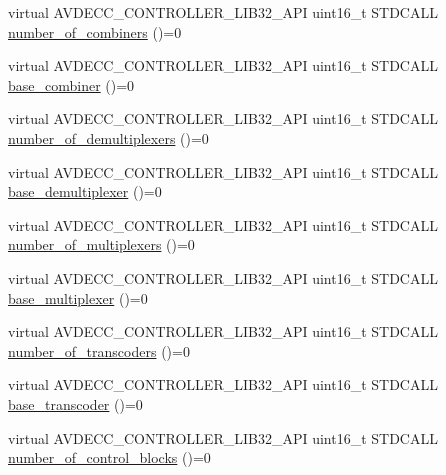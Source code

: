 \begin{DoxyCompactItemize}
\item 
virtual A\+V\+D\+E\+C\+C\+\_\+\+C\+O\+N\+T\+R\+O\+L\+L\+E\+R\+\_\+\+L\+I\+B32\+\_\+\+A\+PI uint16\+\_\+t S\+T\+D\+C\+A\+LL \hyperlink{classavdecc__lib_1_1audio__unit__descriptor__response_ac1a2c85e1ee224b6af5ce5e04183b3b8}{number\+\_\+of\+\_\+combiners} ()=0
\item 
virtual A\+V\+D\+E\+C\+C\+\_\+\+C\+O\+N\+T\+R\+O\+L\+L\+E\+R\+\_\+\+L\+I\+B32\+\_\+\+A\+PI uint16\+\_\+t S\+T\+D\+C\+A\+LL \hyperlink{classavdecc__lib_1_1audio__unit__descriptor__response_ad2ed6c298e99279c61cd9bad311a3db4}{base\+\_\+combiner} ()=0
\item 
virtual A\+V\+D\+E\+C\+C\+\_\+\+C\+O\+N\+T\+R\+O\+L\+L\+E\+R\+\_\+\+L\+I\+B32\+\_\+\+A\+PI uint16\+\_\+t S\+T\+D\+C\+A\+LL \hyperlink{classavdecc__lib_1_1audio__unit__descriptor__response_a1f51a5c28ed8984f4ff5bd36fe74230f}{number\+\_\+of\+\_\+demultiplexers} ()=0
\item 
virtual A\+V\+D\+E\+C\+C\+\_\+\+C\+O\+N\+T\+R\+O\+L\+L\+E\+R\+\_\+\+L\+I\+B32\+\_\+\+A\+PI uint16\+\_\+t S\+T\+D\+C\+A\+LL \hyperlink{classavdecc__lib_1_1audio__unit__descriptor__response_ac2b5c1d4b61b5e0819eda852932d1bc4}{base\+\_\+demultiplexer} ()=0
\item 
virtual A\+V\+D\+E\+C\+C\+\_\+\+C\+O\+N\+T\+R\+O\+L\+L\+E\+R\+\_\+\+L\+I\+B32\+\_\+\+A\+PI uint16\+\_\+t S\+T\+D\+C\+A\+LL \hyperlink{classavdecc__lib_1_1audio__unit__descriptor__response_ab9eb22dad38f80e0d6886ac65384ad7e}{number\+\_\+of\+\_\+multiplexers} ()=0
\item 
virtual A\+V\+D\+E\+C\+C\+\_\+\+C\+O\+N\+T\+R\+O\+L\+L\+E\+R\+\_\+\+L\+I\+B32\+\_\+\+A\+PI uint16\+\_\+t S\+T\+D\+C\+A\+LL \hyperlink{classavdecc__lib_1_1audio__unit__descriptor__response_a0e9b358ce1d3bcadf069b2ba98703be7}{base\+\_\+multiplexer} ()=0
\item 
virtual A\+V\+D\+E\+C\+C\+\_\+\+C\+O\+N\+T\+R\+O\+L\+L\+E\+R\+\_\+\+L\+I\+B32\+\_\+\+A\+PI uint16\+\_\+t S\+T\+D\+C\+A\+LL \hyperlink{classavdecc__lib_1_1audio__unit__descriptor__response_a55670f24cb0eef2234ebd0629e4fb503}{number\+\_\+of\+\_\+transcoders} ()=0
\item 
virtual A\+V\+D\+E\+C\+C\+\_\+\+C\+O\+N\+T\+R\+O\+L\+L\+E\+R\+\_\+\+L\+I\+B32\+\_\+\+A\+PI uint16\+\_\+t S\+T\+D\+C\+A\+LL \hyperlink{classavdecc__lib_1_1audio__unit__descriptor__response_aefa33c5c004be51707d39f570c7e7820}{base\+\_\+transcoder} ()=0
\item 
virtual A\+V\+D\+E\+C\+C\+\_\+\+C\+O\+N\+T\+R\+O\+L\+L\+E\+R\+\_\+\+L\+I\+B32\+\_\+\+A\+PI uint16\+\_\+t S\+T\+D\+C\+A\+LL \hyperlink{classavdecc__lib_1_1audio__unit__descriptor__response_a987663f7b6993b22248204c6d1f59f53}{number\+\_\+of\+\_\+control\+\_\+blocks} ()=0

\end{DoxyCompactItemize}
